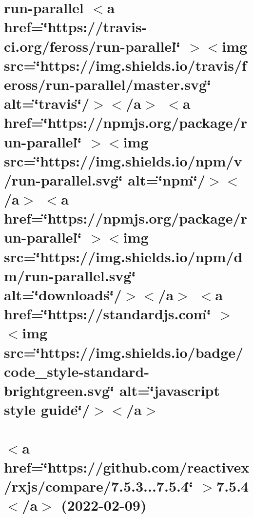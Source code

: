 \documentclass[twoside]{book}
\newcommand{\+}{\discretionary{\mbox{\scriptsize$\hookleftarrow$}}{}{}}
\begin{document}
\chapter{run-\/parallel \texorpdfstring{$<$}{<}a href=\char`\"{}https\+://travis-\/ci.\+org/feross/run-\/parallel\char`\"{} \texorpdfstring{$>$}{>}\texorpdfstring{$<$}{<}img src=\char`\"{}https\+://img.\+shields.\+io/travis/feross/run-\/parallel/master.\+svg\char`\"{} alt=\char`\"{}travis\char`\"{}/\texorpdfstring{$>$}{>}\texorpdfstring{$<$}{<}/a\texorpdfstring{$>$}{>} \texorpdfstring{$<$}{<}a href=\char`\"{}https\+://npmjs.\+org/package/run-\/parallel\char`\"{} \texorpdfstring{$>$}{>}\texorpdfstring{$<$}{<}img src=\char`\"{}https\+://img.\+shields.\+io/npm/v/run-\/parallel.\+svg\char`\"{} alt=\char`\"{}npm\char`\"{}/\texorpdfstring{$>$}{>}\texorpdfstring{$<$}{<}/a\texorpdfstring{$>$}{>} \texorpdfstring{$<$}{<}a href=\char`\"{}https\+://npmjs.\+org/package/run-\/parallel\char`\"{} \texorpdfstring{$>$}{>}\texorpdfstring{$<$}{<}img src=\char`\"{}https\+://img.\+shields.\+io/npm/dm/run-\/parallel.\+svg\char`\"{} alt=\char`\"{}downloads\char`\"{}/\texorpdfstring{$>$}{>}\texorpdfstring{$<$}{<}/a\texorpdfstring{$>$}{>} \texorpdfstring{$<$}{<}a href=\char`\"{}https\+://standardjs.\+com\char`\"{} \texorpdfstring{$>$}{>}\texorpdfstring{$<$}{<}img src=\char`\"{}https\+://img.\+shields.\+io/badge/code\+\_\+style-\/standard-\/brightgreen.\+svg\char`\"{} alt=\char`\"{}javascript style guide\char`\"{}/\texorpdfstring{$>$}{>}\texorpdfstring{$<$}{<}/a\texorpdfstring{$>$}{>}}
\label{md__c___users_vaishnavi_jadhav__desktop__developer_code_mean_stack_example_client_node_modules_run_parallel__r_e_a_d_m_e}

\chapter{\texorpdfstring{$<$}{<}a href=\char`\"{}https\+://github.\+com/reactivex/rxjs/compare/7.\+5.\+3...\+7.\+5.\+4\char`\"{} \texorpdfstring{$>$}{>}7.5.4\texorpdfstring{$<$}{<}/a\texorpdfstring{$>$}{>} (2022-\/02-\/09)}
\label{md__c___users_vaishnavi_jadhav__desktop__developer_code_mean_stack_example_client_node_modules_rxjs__c_h_a_n_g_e_l_o_g}

\end{document}
